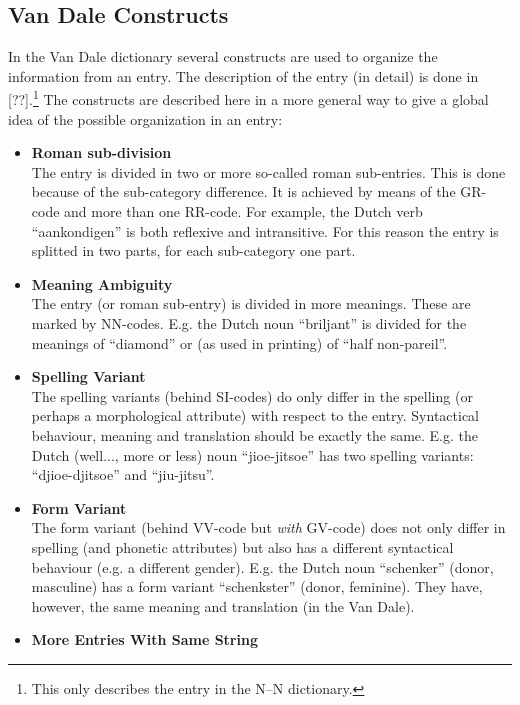 \subsection{Van Dale Constructs}

In the Van Dale dictionary several constructs are used to organize the 
information from an entry. The description of the entry (in detail) is done
in [??].\footnote{This only describes the entry in the N--N dictionary.} The
constructs are described here in a more general way to give a global idea of
the possible organization in an entry:

\begin{itemize}
  \item {\bf Roman sub-division}\\
        The entry is divided in two or more so-called roman sub-entries.
        This is done because of the sub-category difference. It is achieved by 
        means of the GR-code and more than one RR-code. For example, the Dutch 
        verb ``aankondigen'' is both reflexive and intransitive. For this reason
        the entry is splitted in two parts, for each sub-category one part.
  \item {\bf Meaning Ambiguity}\\
        The entry (or roman sub-entry) is divided in more meanings. These are
        marked by NN-codes. E.g. the Dutch noun ``briljant'' is divided for the 
        meanings of ``diamond'' or (as used in printing) of ``half non-pareil''.
  \item {\bf Spelling Variant}\\
        The spelling variants (behind SI-codes) do only differ in the spelling 
        (or perhaps a morphological attribute) with respect to the entry. 
        Syntactical behaviour, meaning and translation should be exactly the 
        same. E.g. the Dutch (well..., more or less) noun ``jioe-jitsoe'' has 
        two spelling variants: ``djioe-djitsoe'' and ``jiu-jitsu''. 
  \item {\bf Form Variant}\\
        The form variant (behind VV-code but {\em with} GV-code) does not only 
        differ in spelling (and phonetic attributes) but also has a different  
        syntactical behaviour (e.g. a different gender). E.g. the Dutch noun 
        ``schenker'' (donor, masculine) has a form variant ``schenkster'' 
        (donor, feminine). They have, however, the same meaning and translation 
        (in the Van Dale).
  \item {\bf More Entries With Same String}\\

\end{itemize}
